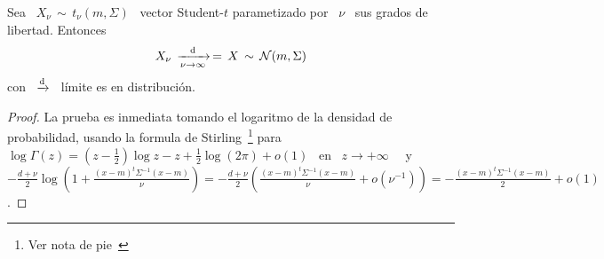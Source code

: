 \begin{lema}
\label{Lem:MP:LimiteGaussiana}
%
  Sea \ $X_\nu \, \sim \, t_\nu(m,\Sigma)$ \ vector Student-$t$ parametizado por
  \ $\nu$ \ sus grados de libertad. Entonces
  \[
  X_\nu \, \xrightarrow[\nu \to \infty]{\mathrm{d}} \, = \, X \, \sim \, \mathcal{N}(m,\Sigma)
  \]
  con \ $\displaystyle \xrightarrow[]{\mathrm{d}}$ \ l\'imite es en distribuci\'on.
\end{lema}
\begin{proof}
  La prueba  es inmediata tomando el  logaritmo de la  densidad de probabilidad,
  usando      la     formula      de     Stirling~\footnote{Ver      nota     de
    pie~} para  \ $\log\Gamma(z) = \left(  z - \frac12
  \right)  \log  z  -  z  +  \frac12   \log(2  \pi)  +  o(1)$  \  en  \  $z  \to
  +\infty$~\cite{Sti30, AbrSte70, GraRyz15} \ y \ $-\frac{d+\nu}{2} \log\left( 1
    +  \frac{(x-m)^t \Sigma^{-1} (x-m)}{\nu}  \right) =  -\frac{d+\nu}{2} \left(
    \frac{(x-m)^t \Sigma^{-1} (x-m)}{\nu} + o\left( \nu^{-1} \right) \right) = -
  \frac{(x-m)^t \Sigma^{-1} (x-m)}{2} + o(1)$.
\end{proof}

